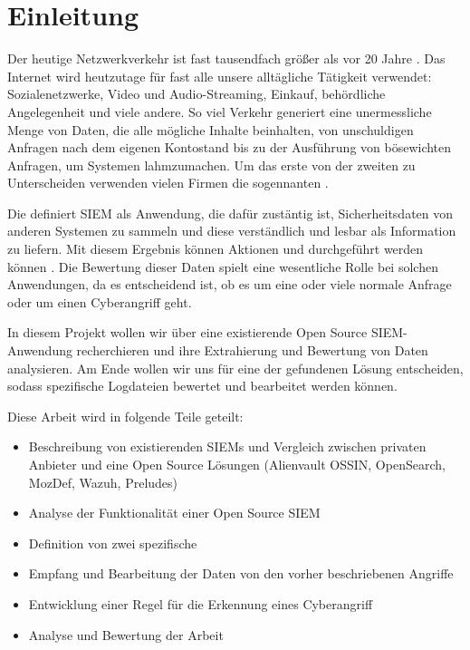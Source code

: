 \section{Einleitung}

Der heutige Netzwerkverkehr ist fast tausendfach größer als vor 20 Jahre \citep{Roser_I}. Das Internet wird heutzutage für fast alle unsere alltägliche Tätigkeit verwendet:  Sozialenetzwerke, Video und Audio-Streaming, Einkauf, behördliche Angelegenheit und viele andere. So viel Verkehr generiert eine unermessliche Menge von Daten, die alle mögliche Inhalte beinhalten, von unschuldigen Anfragen nach dem eigenen Kontostand bis zu der Ausführung von bösewichten Anfragen, um Systemen lahmzumachen. Um das erste von der zweiten zu Unterscheiden verwenden vielen Firmen die sogennanten .

Die  definiert \acrshort{SIEM} als Anwendung, die dafür zustäntig ist, Sicherheitsdaten von anderen Systemen zu sammeln und diese verständlich und lesbar als Information zu liefern. Mit diesem Ergebnis können Aktionen und durchgeführt werden können \citep{NIST_SIEM}. Die Bewertung dieser Daten spielt eine wesentliche Rolle bei solchen Anwendungen, da es entscheidend ist, ob es um eine oder viele normale Anfrage oder um einen \gls{Cyberangriff} geht.

In diesem Projekt wollen wir über eine existierende \gls{Open Source} \gls{SIEM}-Anwendung recherchieren und ihre Extrahierung und Bewertung von Daten analysieren. Am Ende wollen wir uns für eine der gefundenen Lösung entscheiden, sodass spezifische Logdateien bewertet und bearbeitet werden können.

Diese Arbeit wird in folgende Teile geteilt:





\begin{itemize}[noitemsep]
   \item Beschreibung von existierenden \glspl{SIEM} und Vergleich zwischen privaten Anbieter und eine \gls{Open Source} Lösungen (Alienvault OSSIN, OpenSearch, MozDef, Wazuh, Preludes)
   \item Analyse der Funktionalität einer \gls{Open Source} \gls{SIEM}
   \item Definition von zwei spezifische 
   \item Empfang und Bearbeitung der Daten von den vorher beschriebenen Angriffe
   \item Entwicklung einer Regel für die Erkennung eines \gls{Cyberangriff}
   \item Analyse und Bewertung der Arbeit
\end{itemize}

